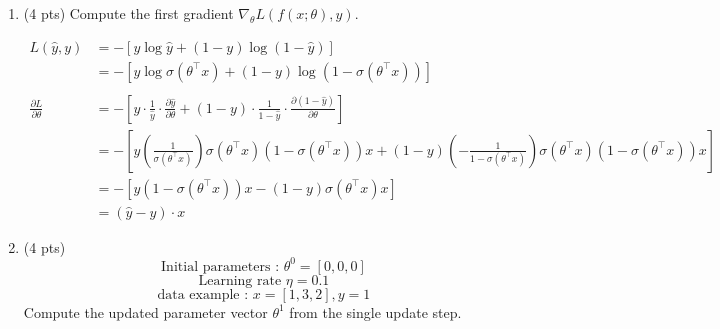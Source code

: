 \documentclass[a4paper]{article}
\theoremstyle{definition}
\newenvironment{soln}{
    \leavevmode\color{blue}\ignorespaces
}{}
\begin{document}
\begin{enumerate}
	      \begin{enumerate}
		      \item (4 pts) Compute the first gradient $\nabla_{\theta} L(f(x;\theta), y)$.

		            \begin{soln}
			            \begin{align*}
				            L(\hat{y}, y)                      & = -[y \log \hat{y} + (1 - y) \log(1 - \hat{y})]                                                                                                                                                                                                              \\
				                                               & = -[y \log \sigma(\theta^\top x) + (1 - y) \log(1 - \sigma(\theta^\top x))]                                                                                                                                                                                  \\\\
				            \frac{\partial L}{\partial \theta} & = -\left[y \cdot \frac{1}{\hat{y}} \cdot \frac{\partial \hat{y}}{\partial \theta} + (1-y) \cdot \frac{1}{1 - \hat{y}} \cdot \frac{\partial (1-\hat{y})}{\partial \theta}\right]                                                                              \\
				                                               & = -\left[y \left(\frac{1}{{\sigma(\theta^\top x)}}\right) \sigma(\theta^\top x) \left(1 - \sigma(\theta^\top x)\right) x + (1 - y) \left(-\frac{1}{{1 - \sigma(\theta^\top x)}}\right) \sigma(\theta^\top x) \left(1 - \sigma(\theta^\top x)\right) x\right] \\
				                                               & = -\left[y (1 - \sigma(\theta^\top x)) x - (1 - y) \sigma(\theta^\top x) x\right]                                                                                                                                                                            \\
				                                               & = (\hat{y} - y) \cdot x
			            \end{align*}
		            \end{soln}

		      \item (4 pts)
		            $$ \text{Initial parameters : }  \theta^{0}=[0, 0, 0]$$
		            $$ \text{Learning rate }\eta=0.1$$
		            $$ \text{data example : } x=[1, 3, 2], y=1$$
		            Compute the updated parameter vector $\theta^{1}$ from the single update step.


\end{enumerate}
\end{enumerate}
\end{document}

